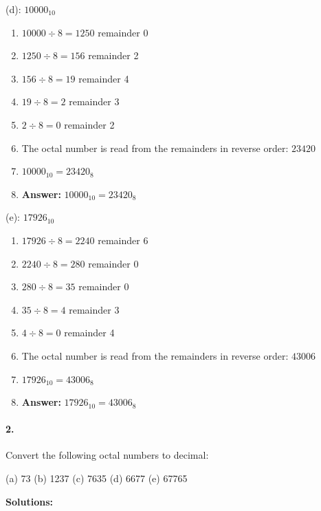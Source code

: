 \documentclass{article}
\begin{document}
\newpage

\noindent (d): $10000_{10}$

\begin{enumerate}
    \item $10000 \div 8 = 1250$ remainder 0
    \item $1250 \div 8 = 156$ remainder 2
    \item $156 \div 8 = 19$ remainder 4
    \item $19 \div 8 = 2$ remainder 3
    \item $2 \div 8 = 0$ remainder 2
    \item The octal number is read from the remainders in reverse order: $23420$
    \item $10000_{10} = 23420_8$
    \item \textbf{Answer:} $10000_{10} = 23420_8$
\end{enumerate}

\vspace*{0.5cm}

\noindent (e): $17926_{10}$

\begin{enumerate}
    \item $17926 \div 8 = 2240$ remainder 6
    \item $2240 \div 8 = 280$ remainder 0
    \item $280 \div 8 = 35$ remainder 0
    \item $35 \div 8 = 4$ remainder 3
    \item $4 \div 8 = 0$ remainder 4
    \item The octal number is read from the remainders in reverse order: $43006$
    \item $17926_{10} = 43006_8$
    \item \textbf{Answer:} $17926_{10} = 43006_8$
\end{enumerate}

\paragraph*{2.}

Convert the following octal numbers to decimal:

\vspace*{0.25cm}

(a) 73 (b) 1237 (c) 7635 (d) 6677 (e) 67765

\vspace*{0.5cm}

\noindent \textbf{Solutions:}
\end{document}

